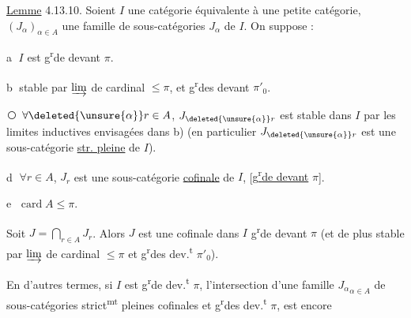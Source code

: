 
\uline{Lemme} 4.13.10. Soient 
$I$ une catégorie équivalente à une petite catégorie,
 $(J_\alpha)_{\alpha\in A}$ une famille
de sous-catégories  $J_\alpha$ de $I$. On
suppose :

\textcircled{a} $I$ est g\textsuperscript{r}de devant $\pi$.




\textcircled{b}   stable par $\varinjlim$ de
cardinal $\leq\pi$, et g\textsuperscript{r}des devant $\pi'_0$.


\textcircled{} $\forall\deleted{\unsure{\alpha}}r\in A$, $J_{\deleted{\unsure{\alpha}}r}$ est stable dans $I$ par
les limites inductives envisagées dans b)
(en particulier $J_{\deleted{\unsure{\alpha}}r}$ est une sous-catégorie
\uline{str. pleine} de $I$).

\textcircled{d} $\forall r\in A$, $J_r$ est une sous-catégorie
\uline{cofinale} de $I$, [\uline{g\textsuperscript{r}de devant} $\pi$].

\textcircled{e} $\operatorname{card}A\leq\pi$.

Soit $J=\bigcap_{r\in A}J_r$. Alors $J$ est une
cofinale dans $I$  g\textsuperscript{r}de devant $\pi$
(et de plus stable  par $\varinjlim$ de cardinal $\leq\pi$
et g\textsuperscript{r}des dev.\textsuperscript{t} $\pi'_0$).

En d'autres termes, si $I$ est g\textsuperscript{r}de
dev.\textsuperscript{t} $\pi$, l'intersection  d'une famille
$ {J_\alpha}_{\alpha\in A}$ de sous-catégories strict\textsuperscript{mt} pleines
cofinales et g\textsuperscript{r}des dev.\textsuperscript{t} $\pi$, est encore
